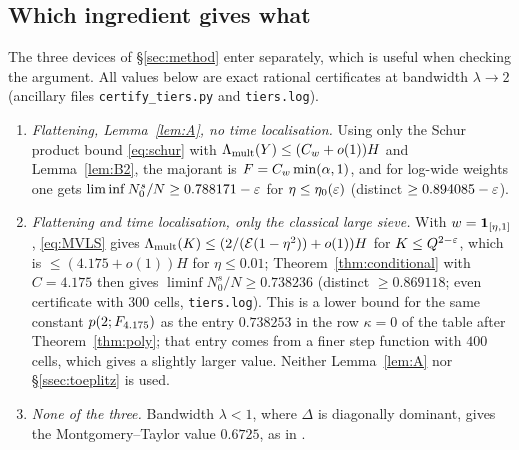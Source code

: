 \documentclass[11pt]{amsart}
\theoremstyle{definition}
\theoremstyle{remark}
\numberwithin{equation}{section}
\begin{document}
\subsection{Which ingredient gives what}\label{sec:fallbacks}
The three devices of \S\ref{sec:method} enter separately, which is useful when checking the argument. All values below are exact rational certificates at bandwidth $\lambda\to2$ (ancillary files \texttt{certify\_tiers.py} and \texttt{tiers.log}).
\begin{enumerate}[label=(\alph*),leftmargin=*]
\item \emph{Flattening, Lemma~\ref{lem:A}, no time localisation.} Using only the Schur product bound \eqref{eq:schur} with $\Lambda_{\mathrm{mult}}(Y)\le(C_w+o(1))H$ and Lemma~\ref{lem:B2}, the majorant is $F=C_w\min(\alpha,1)$, and for log-wide weights one gets $\liminf N^s_0/N\ge0.788171-\varepsilon$ for $\eta\le\eta_0(\varepsilon)$ (distinct $\ge0.894085-\varepsilon$).
\item \emph{Flattening and time localisation, only the classical large sieve.} With $w=\mathbf 1_{[\eta,1]}$, \eqref{eq:MVLS} gives $\Lambda_{\mathrm{mult}}(K)\le(2/(\mathcal E(1-\eta^2))+o(1))H$ for $K\le Q^{2-\varepsilon}$, which is $\le(4.175+o(1))H$ for $\eta\le0.01$; Theorem~\ref{thm:conditional} with $C=4.175$ then gives $\liminf N^s_0/N\ge0.738236$ (distinct $\ge0.869118$; even certificate with $300$ cells, \texttt{tiers.log}). This is a lower bound for the same constant $p(2;F_{4.175})$ as the entry $0.738253$ in the row $\kappa=0$ of the table after Theorem~\ref{thm:poly}; that entry comes from a finer step function with $400$ cells, which gives a slightly larger value. Neither Lemma~\ref{lem:A} nor \S\ref{ssec:toeplitz} is used.
\item \emph{None of the three.} Bandwidth $\lambda<1$, where $\Delta$ is diagonally dominant, gives the Montgomery--Taylor value $0.6725$, as in \cite{HY26}.
\end{enumerate}
\end{document}
